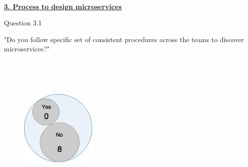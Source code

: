 \\
\textbf{\underline{3. Process to design microservices}}\\
\begin{shaded} Question 3.1 \end{shaded} \label{question:hybris_architecture/interview/question_3.1}
"Do you follow specific set of consistent procedures across the teams to discover microservices?"\\

\\

\\
\begin{figure}[H]
\begin{center}
\includegraphics[scale=0.5]{figures/question3_1}
\label{fig:hybris_architecture/interview/question3-1}
\end{center}
\end{figure}
